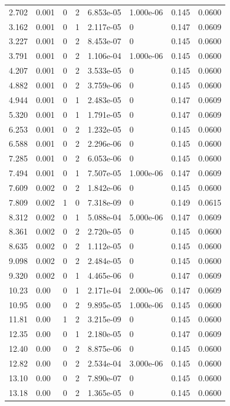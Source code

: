 \documentclass[preview]{standalone}
\begin{document}
{{\begin{tabular}{L{1.2cm}C{1.2cm} C{0.3cm}C{0.5cm} C{1.4cm}C{1.4cm} C{1.4cm}C{1.4cm}}
  2.702  &  0.001  & 0     &  2 &  6.853e-05  & 1.000e-06  & 0.145 &  0.0600   \\ 
  3.162  &  0.001  & 0     &  1 &  2.117e-05  & 0  & 0.147 &  0.0609   \\ 
  3.227  &  0.001  & 0     &  2 &  8.453e-07  & 0  & 0.145 &  0.0600   \\ 
  3.791  &  0.001  & 0     &  2 &  1.106e-04  & 1.000e-06  & 0.145 &  0.0600   \\ 
  4.207  &  0.001  & 0     &  2 &  3.533e-05  & 0  & 0.145 &  0.0600   \\ 
  4.882  &  0.001  & 0     &  2 &  3.759e-06  & 0  & 0.145 &  0.0600   \\ 
  4.944  &  0.001  & 0     &  1 &  2.483e-05  & 0  & 0.147 &  0.0609   \\ 
  5.320  &  0.001  & 0     &  1 &  1.791e-05  & 0  & 0.147 &  0.0609   \\ 
  6.253  &  0.001  & 0     &  2 &  1.232e-05  & 0  & 0.145 &  0.0600   \\ 
  6.588  &  0.001  & 0     &  2 &  2.296e-06  & 0  & 0.145 &  0.0600   \\ 
  7.285  &  0.001  & 0     &  2 &  6.053e-06  & 0  & 0.145 &  0.0600   \\ 
  7.494  &  0.001  & 0     &  1 &  7.507e-05  & 1.000e-06  & 0.147 &  0.0609   \\ 
  7.609  &  0.002  & 0     &  2 &  1.842e-06  & 0  & 0.145 &  0.0600   \\ 
  7.809  &  0.002  & 1     &  0 &  7.318e-09  & 0  & 0.149 &  0.0615   \\ 
  8.312  &  0.002  & 0     &  1 &  5.088e-04  & 5.000e-06  & 0.147 &  0.0609   \\ 
  8.361  &  0.002  & 0     &  2 &  2.720e-05  & 0  & 0.145 &  0.0600   \\ 
  8.635  &  0.002  & 0     &  2 &  1.112e-05  & 0  & 0.145 &  0.0600   \\ 
  9.098  &  0.002  & 0     &  2 &  2.484e-05  & 0  & 0.145 &  0.0600   \\ 
  9.320  &  0.002  & 0     &  1 &  4.465e-06  & 0  & 0.147 &  0.0609   \\ 
  10.23  &  0.00  & 0     &  1 &  2.171e-04  & 2.000e-06  & 0.147 &  0.0609   \\ 
  10.95  &  0.00  & 0     &  2 &  9.895e-05  & 1.000e-06  & 0.145 &  0.0600   \\ 
  11.81  &  0.00  & 1     &  2 &  3.215e-09  & 0  & 0.145 &  0.0600   \\ 
  12.35  &  0.00  & 0     &  1 &  2.180e-05  & 0  & 0.147 &  0.0609   \\ 
  12.40  &  0.00  & 0     &  2 &  8.875e-06  & 0  & 0.145 &  0.0600   \\ 
  12.82  &  0.00  & 0     &  2 &  2.534e-04  & 3.000e-06  & 0.145 &  0.0600   \\ 
  13.10  &  0.00  & 0     &  2 &  7.890e-07  & 0  & 0.145 &  0.0600   \\ 
  13.18  &  0.00  & 0     &  2 &  1.365e-05  & 0  & 0.145 &  0.0600   \\ 
\hline 
\end{tabular} 

}}
\end{document}
